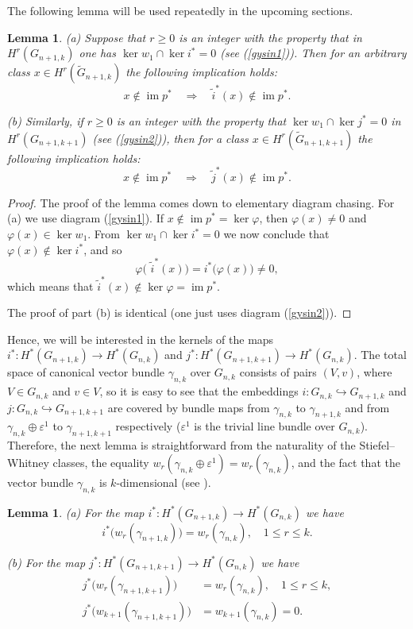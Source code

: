 \documentclass{amsart}
\newcommand{\im}{\operatorname{im}}
\newtheorem{lemma}[theorem]{Lemma}
\theoremstyle{definition}
\theoremstyle{remark}
\numberwithin{equation}{section}
\begin{document}
The following lemma will be used repeatedly in the upcoming sections.

\begin{lemma}\label{osnovna_lema}
{\rm(a)} Suppose that $r\ge0$ is an integer with the property that in $H^r(G_{n+1,k})$ one has $\ker w_1\cap\ker i^*=0$ (see (\ref{gysin1})). Then for an arbitrary class $x\in H^r(\widetilde G_{n+1,k})$ the following implication holds:
 \[x\notin\im p^* \quad \Longrightarrow \quad \widetilde i^*(x)\notin\im p^*.\]

 {\rm(b)} Similarly, if $r\ge0$ is an integer with the property that $\ker w_1\cap\ker j^*=0$ in $H^r(G_{n+1,k+1})$ (see (\ref{gysin2})), then for a class $x\in H^r(\widetilde G_{n+1,k+1})$ the following implication holds:
 \[x\notin\im p^* \quad \Longrightarrow \quad \widetilde j^*(x)\notin\im p^*.\]
\end{lemma}
\begin{proof}
    The proof of the lemma comes down to elementary diagram chasing. For (a) we use diagram (\ref{gysin1}). If $x\notin\im p^*=\ker\varphi$, then $\varphi(x)\neq0$ and $\varphi(x)\in\ker w_1$. From $\ker w_1\cap\ker i^*=0$ we now conclude that $\varphi(x)\notin\ker i^*$, and so
    \[\varphi\big(\,\,\widetilde i^*(x)\big)=i^*\big(\varphi(x)\big)\neq0,\]
    which means that $\widetilde i^*(x)\notin\ker\varphi=\im p^*$.

    The proof of part (b) is identical (one just uses diagram (\ref{gysin2})).
\end{proof}

Hence, we will be interested in the kernels of the maps $i^*:H^*(G_{n+1,k})\rightarrow H^*(G_{n,k})$ and $j^*:H^*(G_{n+1,k+1})\rightarrow H^*(G_{n,k})$. The total space of canonical vector bundle $\gamma_{n,k}$ over $G_{n,k}$ consists of pairs $(V,v)$, where $V\in G_{n,k}$ and $v\in V$, so it is easy to see that the embeddings $i:G_{n,k}\hookrightarrow G_{n+1,k}$ and $j:G_{n,k}\hookrightarrow G_{n+1,k+1}$ are covered by bundle maps from $\gamma_{n,k}$ to $\gamma_{n+1,k}$ and from $\gamma_{n,k}\oplus\varepsilon^1$ to $\gamma_{n+1,k+1}$ respectively ($\varepsilon^1$ is the trivial line bundle over $G_{n,k}$). Therefore, the next lemma is straightforward from the naturality of the Stiefel--Whitney classes, the equality $w_r(\gamma_{n,k}\oplus\varepsilon^1)=w_r(\gamma_{n,k})$, and the fact that the vector bundle $\gamma_{n,k}$ is $k$-dimensional (see \cite[p.\ 37ff]{MilnorSt}).

\begin{lemma}\label{naturality}
{\rm(a)} For the map $i^*:H^*(G_{n+1,k})\rightarrow H^*(G_{n,k})$ we have
 \[i^*\big(w_r(\gamma_{n+1,k})\big)=w_r(\gamma_{n,k}), \quad 1\le r\le k.\]

 {\rm(b)} For the map $j^*:H^*(G_{n+1,k+1})\rightarrow H^*(G_{n,k})$ we have
 \begin{align*}
  j^*\big(w_r(\gamma_{n+1,k+1})\big)&=w_r(\gamma_{n,k}), \quad 1\le r\le k,\\
  j^*\big(w_{k+1}(\gamma_{n+1,k+1})\big)&=w_{k+1}(\gamma_{n,k})=0.   
 \end{align*}
\end{lemma}
\end{document}
